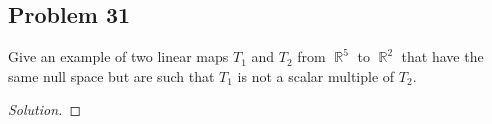 \documentclass[letterpaper, 12pt]{amsart}
\DeclareMathOperator{\R}{\mathbb{R}}
\theoremstyle{definition}  %
\begin{document}
		\subsection*{Problem 31}
		Give an example of two linear maps $T_{1}$ and $T_{2}$ from $\R^{5}$ to $\R^{2}$ that have the same null space but are such that $T_{1}$ is not a scalar multiple of $T_{2}$.

		\begin{proof}[Solution]
		\end{proof}
\end{document}
